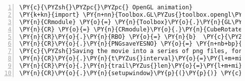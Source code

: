 \begin{Verbatim}[commandchars=\\\{\},fontsize=\small, numbers = left, frame=bottomline]
\PY{c}{\PYZsh{}\PYZpc{}\PYZpc{} OpenGL animation}
\PY{k+kn}{import} \PY{n+nn}{Toolbox.GL\PYZus{}toolbox.opengl\PYZus{}window\PYZus{}and\PYZus{}animation\PYZus{}creation\PYZus{}module}
\PY{n}{CRmodule} \PY{o}{=} \PY{n}{Toolbox}\PY{o}{.}\PY{n}{GL\PYZus{}toolbox}\PY{o}{.}\PY{n}{opengl\PYZus{}window\PYZus{}and\PYZus{}animation\PYZus{}creation\PYZus{}module}
\PY{n}{CR} \PY{o}{=} \PY{n}{CRmodule}\PY{o}{.}\PY{n}{CubeRotate}\PY{p}{(}\PY{p}{)}  \PY{c}{\PYZsh{}opengl context setup    }
\PY{n}{CR}\PY{o}{.}\PY{n}{RBO} \PY{o}{=} \PY{n}{b}  \PY{c}{\PYZsh{}passing in the solved results}
\PY{n}{CR}\PY{o}{.}\PY{n}{PNGsaveYESNO} \PY{o}{=} \PY{n+nb+bp}{False} 
\PY{c}{\PYZsh{}Saving the movie into a series of png files, for example making a movie.}
\PY{n}{CR}\PY{o}{.}\PY{n}{t\PYZus{}interval}\PY{o}{=}\PY{l+m+mi}{20}
\PY{n}{CR}\PY{o}{.}\PY{n}{trail\PYZus{}len}\PY{o}{=}\PY{l+m+mi}{150}
\PY{n}{CR}\PY{o}{.}\PY{n}{setupwindow}\PY{p}{(}\PY{p}{)} \PY{c}{\PYZsh{}animate}
\end{Verbatim}
